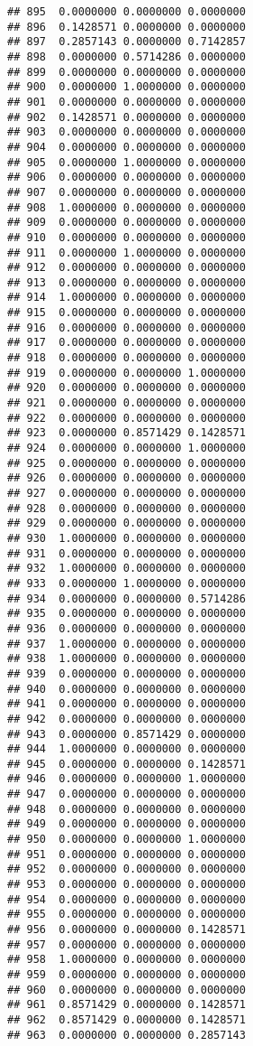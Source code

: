 \documentclass[
]{article}
\begin{document}
\begin{verbatim}
## 895  0.0000000 0.0000000 0.0000000
## 896  0.1428571 0.0000000 0.0000000
## 897  0.2857143 0.0000000 0.7142857
## 898  0.0000000 0.5714286 0.0000000
## 899  0.0000000 0.0000000 0.0000000
## 900  0.0000000 1.0000000 0.0000000
## 901  0.0000000 0.0000000 0.0000000
## 902  0.1428571 0.0000000 0.0000000
## 903  0.0000000 0.0000000 0.0000000
## 904  0.0000000 0.0000000 0.0000000
## 905  0.0000000 1.0000000 0.0000000
## 906  0.0000000 0.0000000 0.0000000
## 907  0.0000000 0.0000000 0.0000000
## 908  1.0000000 0.0000000 0.0000000
## 909  0.0000000 0.0000000 0.0000000
## 910  0.0000000 0.0000000 0.0000000
## 911  0.0000000 1.0000000 0.0000000
## 912  0.0000000 0.0000000 0.0000000
## 913  0.0000000 0.0000000 0.0000000
## 914  1.0000000 0.0000000 0.0000000
## 915  0.0000000 0.0000000 0.0000000
## 916  0.0000000 0.0000000 0.0000000
## 917  0.0000000 0.0000000 0.0000000
## 918  0.0000000 0.0000000 0.0000000
## 919  0.0000000 0.0000000 1.0000000
## 920  0.0000000 0.0000000 0.0000000
## 921  0.0000000 0.0000000 0.0000000
## 922  0.0000000 0.0000000 0.0000000
## 923  0.0000000 0.8571429 0.1428571
## 924  0.0000000 0.0000000 1.0000000
## 925  0.0000000 0.0000000 0.0000000
## 926  0.0000000 0.0000000 0.0000000
## 927  0.0000000 0.0000000 0.0000000
## 928  0.0000000 0.0000000 0.0000000
## 929  0.0000000 0.0000000 0.0000000
## 930  1.0000000 0.0000000 0.0000000
## 931  0.0000000 0.0000000 0.0000000
## 932  1.0000000 0.0000000 0.0000000
## 933  0.0000000 1.0000000 0.0000000
## 934  0.0000000 0.0000000 0.5714286
## 935  0.0000000 0.0000000 0.0000000
## 936  0.0000000 0.0000000 0.0000000
## 937  1.0000000 0.0000000 0.0000000
## 938  1.0000000 0.0000000 0.0000000
## 939  0.0000000 0.0000000 0.0000000
## 940  0.0000000 0.0000000 0.0000000
## 941  0.0000000 0.0000000 0.0000000
## 942  0.0000000 0.0000000 0.0000000
## 943  0.0000000 0.8571429 0.0000000
## 944  1.0000000 0.0000000 0.0000000
## 945  0.0000000 0.0000000 0.1428571
## 946  0.0000000 0.0000000 1.0000000
## 947  0.0000000 0.0000000 0.0000000
## 948  0.0000000 0.0000000 0.0000000
## 949  0.0000000 0.0000000 0.0000000
## 950  0.0000000 0.0000000 1.0000000
## 951  0.0000000 0.0000000 0.0000000
## 952  0.0000000 0.0000000 0.0000000
## 953  0.0000000 0.0000000 0.0000000
## 954  0.0000000 0.0000000 0.0000000
## 955  0.0000000 0.0000000 0.0000000
## 956  0.0000000 0.0000000 0.1428571
## 957  0.0000000 0.0000000 0.0000000
## 958  1.0000000 0.0000000 0.0000000
## 959  0.0000000 0.0000000 0.0000000
## 960  0.0000000 0.0000000 0.0000000
## 961  0.8571429 0.0000000 0.1428571
## 962  0.8571429 0.0000000 0.1428571
## 963  0.0000000 0.0000000 0.2857143

\end{verbatim}
\end{document}

